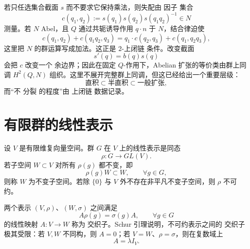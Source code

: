 若只任选集合截面 $s$ 而不要求它保持乘法，则失配由 因子 集合
\[
c(q_1,q_2)
:=s(q_1)s(q_2)s(q_1q_2)^{-1}
\in N
\]
测量。若 $N$ Abel，且 $Q$ 通过共轭诱导作用 $q\cdot n$ 于 $N$，结合律迫使
\begin{equation*}c(q_1,q_2)
+c(q_1q_2,q_3)
=q_1\cdot c(q_2,q_3)
+c(q_1,q_2q_3),\end{equation*}
这里把 $N$ 的群运算写成加法。这正是 $2$-上闭链 条件。改变截面
\[
s'(q)=b(q)s(q)
\]
会把 $c$ 改变一个 余边界；因此在固定 $Q$-作用下，Abelian 扩张的等价类由群上同调 $H^2(Q,N)$ 组织。这里不展开完整群上同调，但这已经给出一个重要层级：
\[
\text{直积}
\subset
\text{半直积}
\subset
\text{一般扩张},
\]
而“不 分裂 的程度”由 上闭链 数据记录。

\section{有限群的线性表示}
\label{sec:finite-group-representations}
设 $V$ 是有限维复向量空间。群 $G$ 在 $V$ 上的线性表示是同态
\[
\rho:G\longrightarrow GL(V).
\]
若子空间 $W\subset V$ 对所有 $\rho(g)$ 都不变，即
\[
\rho(g)W\subset W,
\qquad \forall g\in G,
\]
则称 $W$ 为不变子空间。若除 $\{0\}$ 与 $V$ 外不存在非平凡不变子空间，则 $\rho$ 不可约。

两个表示 $(V,\rho)$、$(W,\sigma)$ 之间满足
\[
A\rho(g)=\sigma(g)A,
\qquad \forall g\in G
\]
的线性映射 $A:V\to W$ 称为 交织子。Schur 引理说明，不可约表示之间的 交织子 极其受限：若 $V,W$ 不同构，则 $A=0$；若 $V=W$、$\rho=\sigma$，则在复数域上
\begin{equation}
A=\lambda I_V.
\label{eq:schur-scalar}
\end{equation}

